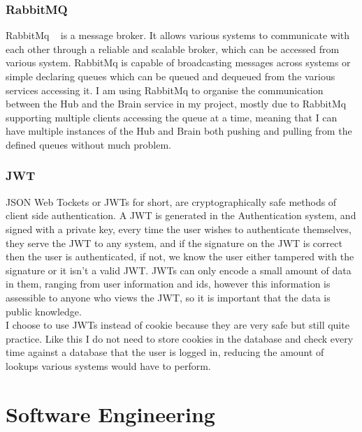 \documentclass[titlepage]{article}
\begin{document}
\subsubsection{RabbitMQ}
RabbitMq ~\cite{rabbitmq} is a message broker. It allows various systems to communicate with each other through a reliable and scalable broker, which can be accessed from various system. RabbitMq is capable of broadcasting messages across systems or simple declaring queues which can be queued and dequeued from the various services accessing it. I am using RabbitMq to organise the communication between the Hub and the Brain service in my project, mostly due to RabbitMq supporting multiple clients accessing the queue at a time, meaning that I can have multiple instances of the Hub and Brain both pushing and pulling from the defined queues without much problem.

\subsubsection{JWT}
JSON Web Tockets or JWTs for short, are cryptographically safe methods of client side authentication. A JWT is generated in the Authentication system, and signed with a private key, every time the user wishes to authenticate themselves, they serve the JWT to any system, and if the signature on the JWT is correct then the user is authenticated, if not, we know the user either tampered with the signature or it isn't a valid JWT. JWTs can only encode a small amount of data in them, ranging from user information and ids, however this information is assessible to anyone who views the JWT, so it is important that the data is public knowledge. \\

I choose to use JWTs instead of cookie because they are very safe but still quite practice. Like this I do not need to store cookies in the database and check every time against a database that the user is logged in, reducing the amount of lookups various systems would have to perform.

\section{Software Engineering}
\end{document}
